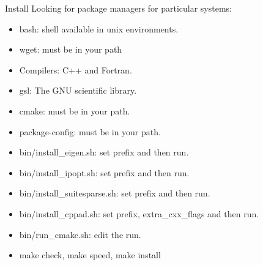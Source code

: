 \documentclass{beamer}
\begin{document}
\begin{frame}{Install}
Looking for package managers for particular systems:
\pause

\begin{itemize}

\item
bash: shell available in unix environments.
\pause

\item
wget: must be in your path
\pause

\item
Compilers: C++ and Fortran.
\pause

\item
gsl: The GNU scientific library.
\pause

\item
cmake: must be in your path.
\pause

\item
package-config: must be in your path.
\pause

\item
bin/install\_eigen.sh: set prefix and then run.
\pause

\item
bin/install\_ipopt.sh: set prefix and then run.
\pause

\item
bin/install\_suitesparse.sh: set prefix and then run.
\pause

\item
bin/install\_cppad.sh: set prefix, extra\_cxx\_flags and then run.
\pause

\item
bin/run\_cmake.sh: edit the run.
\pause

\item
make check, make speed, make install
\pause

\end{itemize}
\end{frame}
\end{document}
